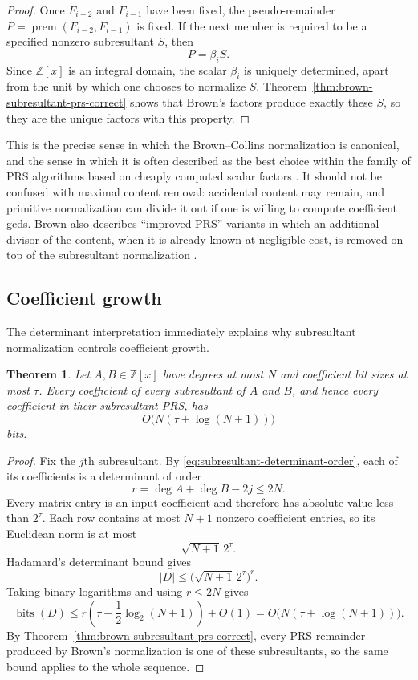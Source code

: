 \documentclass[11pt]{book}
\newtheorem{theorem}{Theorem}[section]
\theoremstyle{definition}
\newcommand{\ZZ}{\mathbb Z}
\newcommand{\bits}{\operatorname{bits}}
\begin{document}
\begin{proof}
Once $F_{i-2}$ and $F_{i-1}$ have been fixed, the pseudo-remainder
$P=\operatorname{prem}(F_{i-2},F_{i-1})$ is fixed.  If the next member is
required to be a specified nonzero subresultant $S$, then
\[
 P=\beta_iS.
\]
Since $\ZZ[x]$ is an integral domain, the scalar $\beta_i$ is uniquely
determined, apart from the unit by which one chooses to normalize $S$.
Theorem~\ref{thm:brown-subresultant-prs-correct} shows that Brown's factors
produce exactly these $S$, so they are the unique factors with this property.
\end{proof}

This is the precise sense in which the Brown--Collins normalization is
canonical, and the sense in which it is often described as the best choice
within the family of PRS algorithms based on cheaply computed scalar factors
\cite{Collins1967,Brown1978}.  It should not be confused with maximal content
removal: accidental content may remain, and primitive normalization can divide
it out if one is willing to compute coefficient gcds.  Brown also describes
``improved PRS'' variants in which an additional divisor of the content, when
it is already known at negligible cost, is removed on top of the subresultant
normalization \cite{Brown1978}.

\subsection{Coefficient growth}

The determinant interpretation immediately explains why subresultant
normalization controls coefficient growth.

\begin{theorem}\label{thm:subresultant-coefficient-growth}
Let $A,B\in\ZZ[x]$ have degrees at most $N$ and coefficient bit sizes at most
$\tau$.  Every coefficient of every subresultant of $A$ and $B$, and hence
every coefficient in their subresultant PRS, has
\begin{equation}\label{eq:subresultant-bit-bound}
 O\bigl(N(\tau+\log(N+1))\bigr)
\end{equation}
bits.
\end{theorem}

\begin{proof}
Fix the $j$th subresultant.  By
\eqref{eq:subresultant-determinant-order}, each of its coefficients is a
determinant of order
\[
 r=\deg A+\deg B-2j\le2N.
\]
Every matrix entry is an input coefficient and therefore has absolute value
less than $2^\tau$.  Each row contains at most $N+1$ nonzero coefficient
entries, so its Euclidean norm is at most
\[
 \sqrt{N+1}\,2^\tau.
\]
Hadamard's determinant bound gives
\[
 |D|
 \le\bigl(\sqrt{N+1}\,2^\tau\bigr)^r.
\]
Taking binary logarithms and using $r\le2N$ gives
\[
 \bits(D)
 \le r\left(\tau+\frac12\log_2(N+1)\right)+O(1)
 =O\bigl(N(\tau+\log(N+1))\bigr).
\]
By Theorem~\ref{thm:brown-subresultant-prs-correct}, every PRS remainder
produced by Brown's normalization is one of these subresultants, so the same
bound applies to the whole sequence.
\end{proof}
\end{document}

